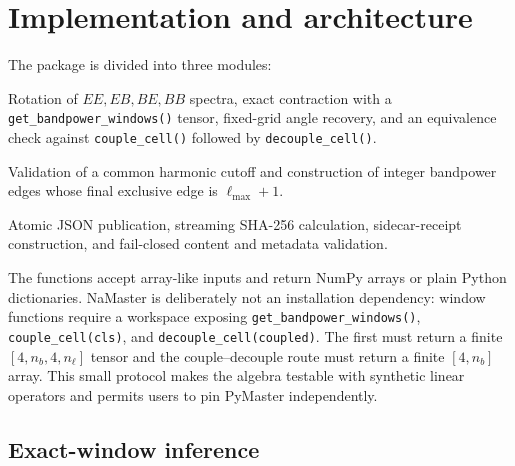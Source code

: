 \section*{Implementation and architecture}

The package is divided into three modules:

\begin{description}[leftmargin=2.8cm,style=nextline]
\item[\texttt{windows}]
  Rotation of \(EE,EB,BE,BB\) spectra, exact contraction with a
  \nolinkurl{get_bandpower_windows()} tensor, fixed-grid angle recovery, and
  an equivalence check against \nolinkurl{couple_cell()} followed by
  \nolinkurl{decouple_cell()}.
\item[Multipoles]
  Validation of a common harmonic cutoff and construction of integer
  bandpower edges whose final exclusive edge is \(\ell_{\max}+1\).
\item[\texttt{receipts}]
  Atomic JSON publication, streaming SHA-256 calculation, sidecar-receipt
  construction, and fail-closed content and metadata validation.
\end{description}

The functions accept array-like inputs and return NumPy arrays or plain Python
dictionaries.  NaMaster is deliberately not an installation dependency:
window functions require a workspace exposing
\nolinkurl{get_bandpower_windows()}, \nolinkurl{couple_cell(cls)}, and
\nolinkurl{decouple_cell(coupled)}. The first must return a finite
\([4,n_b,4,n_\ell]\) tensor and the couple--decouple route must return a finite
\([4,n_b]\) array. This small protocol makes the algebra testable with synthetic
linear operators and permits users to pin PyMaster independently.

\subsection*{Exact-window inference}

